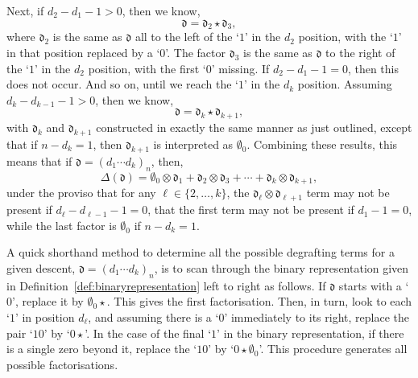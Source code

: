 \documentclass[5p,twocolumn]{elsarticle}
\newcommand*{\df}{\mathfrak d}
\begin{document}
Next, if $d_2-d_1-1>0$, then we know,
\begin{equation*}
     \df=\df_2\star\df_3,
\end{equation*}
where $\df_2$ is the same as $\df$ all to the left of the `$1$' in the $d_2$ position, with the `$1$' in that position replaced by a `$0$'.  
The factor $\df_3$ is the same as $\df$ to the right of the `$1$' in the $d_2$ position,  with the first `$0$' missing.
If $d_2-d_1-1=0$, then this does not occur. And so on, until we reach the `$1$' in the $d_k$ position. 
Assuming $d_k-d_{k-1}-1>0$, then we know,
\begin{equation*}
     \df=\df_k\star\df_{k+1},
\end{equation*}
with $\df_k$ and $\df_{k+1}$ constructed in exactly the same manner as just outlined, except that if $n-d_k=1$, then $\df_{k+1}$
is interpreted as $\emptyset_0$. Combining these results, this means that if $\df=(d_1\cdots d_k)_n$, then,
\begin{equation*}
\Delta(\df)=\emptyset_0\otimes\df_1+\df_2\otimes\df_3+\cdots+\df_k\otimes\df_{k+1},
\end{equation*}
under the proviso that for any $\ell\in\{2,\ldots,k\}$, the $\df_\ell\otimes\df_{\ell+1}$ term may not be present if $d_\ell-d_{\ell-1}-1=0$,
that the first term may not be present if $d_1-1=0$, while the last factor is $\emptyset_0$ if $n-d_k=1$.
%
\begin{remark}\label{rmk:shorthand}
  A quick shorthand method to determine all the possible degrafting terms for a given descent, $\df=(d_1\cdots d_k)_n$,
  is to scan through the binary representation given in Definition~\ref{def:binaryrepresentation} left to right as follows.
  If $\df$ starts with a `$0$', replace it by $\emptyset_0\star$. This gives the first factorisation. Then, in turn, look to each `$1$'
  in position $d_\ell$, and assuming there is a `$0$' immediately to its right, replace the pair `$10$' by `$0\star$'.
  In the case of the final `$1$' in the binary representation, if there is a single zero beyond it, replace the `$10$' by `$0\star\emptyset_0$'. 
  This procedure generates all possible factorisations.
\end{remark}
%
\end{document}
